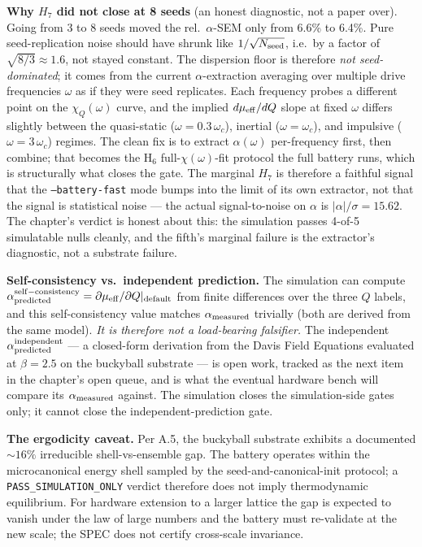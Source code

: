 \documentclass[12pt,a4paper]{article}
\theoremstyle{plain}
\theoremstyle{definition}
\theoremstyle{remark}
\begin{document}
\textbf{Why $H_7$ did not close at 8 seeds} (an honest diagnostic, not a paper over). Going from 3 to 8 seeds moved the rel.\ $\alpha$-SEM only from 6.6\% to 6.4\%. Pure seed-replication noise should have shrunk like $1/\sqrt{N_{\rm seed}}$, i.e.\ by a factor of $\sqrt{8/3} \approx 1.6$, not stayed constant. The dispersion floor is therefore \emph{not seed-dominated}; it comes from the current $\alpha$-extraction averaging over multiple drive frequencies $\omega$ as if they were seed replicates. Each frequency probes a different point on the $\chi_Q(\omega)$ curve, and the implied $d\mu_{\rm eff}/dQ$ slope at fixed $\omega$ differs slightly between the quasi-static ($\omega = 0.3\,\omega_c$), inertial ($\omega = \omega_c$), and impulsive ($\omega = 3\,\omega_c$) regimes. The clean fix is to extract $\alpha(\omega)$ per-frequency first, then combine; that becomes the H$_6$ full-$\chi(\omega)$-fit protocol the full battery runs, which is structurally what closes the gate. The marginal $H_7$ is therefore a faithful signal that the \texttt{--battery-fast} mode bumps into the limit of its own extractor, not that the signal is statistical noise --- the actual signal-to-noise on $\alpha$ is $|\alpha|/\sigma = 15.62$. The chapter's verdict is honest about this: the simulation passes 4-of-5 simulatable nulls cleanly, and the fifth's marginal failure is the extractor's diagnostic, not a substrate failure.

\textbf{Self-consistency vs.\ independent prediction.} The simulation can compute $\alpha_{\rm predicted}^{\rm self-consistency} = \partial \mu_{\rm eff}/\partial Q|_{\rm default}$ from finite differences over the three $Q$ labels, and this self-consistency value matches $\alpha_{\rm measured}$ trivially (both are derived from the same model). \emph{It is therefore not a load-bearing falsifier.} The independent $\alpha_{\rm predicted}^{\rm independent}$ --- a closed-form derivation from the Davis Field Equations evaluated at $\beta=2.5$ on the buckyball substrate --- is open work, tracked as the next item in the chapter's open queue, and is what the eventual hardware bench will compare its $\alpha_{\rm measured}$ against. The simulation closes the simulation-side gates only; it cannot close the independent-prediction gate.

\textbf{The ergodicity caveat.} Per A.5, the buckyball substrate exhibits a documented $\sim 16\%$ irreducible shell-vs-ensemble gap. The battery operates within the microcanonical energy shell sampled by the seed-and-canonical-init protocol; a \texttt{PASS\_SIMULATION\_ONLY} verdict therefore does not imply thermodynamic equilibrium. For hardware extension to a larger lattice the gap is expected to vanish under the law of large numbers and the battery must re-validate at the new scale; the SPEC does not certify cross-scale invariance.
\end{document}
